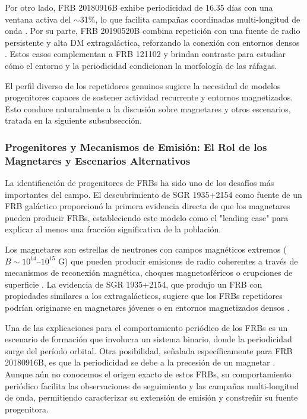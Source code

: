 Por otro lado, FRB 20180916B exhibe periodicidad de 16.35 días con una ventana activa del $\sim$31\%, lo que facilita campañas coordinadas multi-longitud de onda \citep{CHIME_FRB_Collaboration_2020}. Por su parte, FRB 20190520B combina repetición con una fuente de radio persistente y alta DM extragaláctica, reforzando la conexión con entornos densos \citep{Niu2022_FRB20190520B}. Estos casos complementan a FRB 121102 y brindan contraste para estudiar cómo el entorno y la periodicidad condicionan la morfología de las ráfagas.

El perfil diverso de los repetidores genuinos sugiere la necesidad de modelos progenitores capaces de sostener actividad recurrente y entornos magnetizados. Esto conduce naturalmente a la discusión sobre magnetares y otros escenarios, tratada en la siguiente subsubsección.

\subsubsection{Progenitores y Mecanismos de Emisión: El Rol de los Magnetares y Escenarios Alternativos}

La identificación de progenitores de FRBs ha sido uno de los desafíos más importantes del campo. El descubrimiento de SGR 1935+2154 como fuente de un FRB galáctico \citep{Bochenek2020,CHIME_SGR2020} proporcionó la primera evidencia directa de que los magnetares pueden producir FRBs, estableciendo este modelo como el "leading case" para explicar al menos una fracción significativa de la población.

Los magnetares son estrellas de neutrones con campos magnéticos extremos ($B \sim 10^{14}$--$10^{15}$ G) que pueden producir emisiones de radio coherentes a través de mecanismos de reconexión magnética, choques magnetosféricos o erupciones de superficie \citep{Bochenek2020}. La evidencia de SGR 1935+2154, que produjo un FRB con propiedades similares a los extragalácticos, sugiere que los FRBs repetidores podrían originarse en magnetares jóvenes o en entornos magnetizados densos \citep{CHIME_SGR2020}.

Una de las explicaciones para el comportamiento periódico de los FRBs es un escenario de formación que involucra un sistema binario, donde la periodicidad surge del período orbital. Otra posibilidad, señalada específicamente para FRB 20180916B, es que la periodicidad se debe a la precesión de un magnetar \citep{Feng2024}. Aunque aún no conocemos el origen exacto de estos FRBs, su comportamiento periódico facilita las observaciones de seguimiento y las campañas multi-longitud de onda, permitiendo caracterizar su extensión de emisión y constreñir su fuente progenitora.

